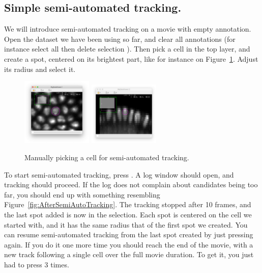 \subsection{Simple semi-automated tracking.}

We will introduce semi-automated tracking on a movie with empty annotation. 
Open the dataset we have been using so far, and clear all annotations (for instance select all  then delete selection \keys{\shift+\backdel}).
Then pick a cell in the top layer, and create a spot, centered on its brightest part, like for instance on Figure~\ref{fig:BeforeSemiAutoTracking}.
Adjust its radius and select it.

\begin{figure}
    \centering
    \null\hfill
    \includegraphics[width=0.3\textwidth]{figures/Mastodon_SemiAutoTracking_01a.png}
    \hfill
    \includegraphics[width=0.3\textwidth]{figures/Mastodon_SemiAutoTracking_01b.png}
    \hfill\null
    \caption{Manually picking a cell for semi-automated tracking.}
    \label{fig:BeforeSemiAutoTracking}
\end{figure}

To start semi-automated tracking, press .
A log window should open, and tracking should proceed. 
If the log does not complain about candidates being too far, you should end up with something resembling Figure~\ref{fig:AfterSemiAutoTracking}.
The tracking stopped after 10 frames, and the last spot added is now in the selection. 
Each spot is centered on the cell we started with, and it has the same radius that of the first spot we created. 
You can resume semi-automated tracking from the last spot created by just pressing  again. 
If you do it one more time you should reach the end of the movie, with a new track following a single cell over the full movie duration.
To get it, you just had to press  3 times.

